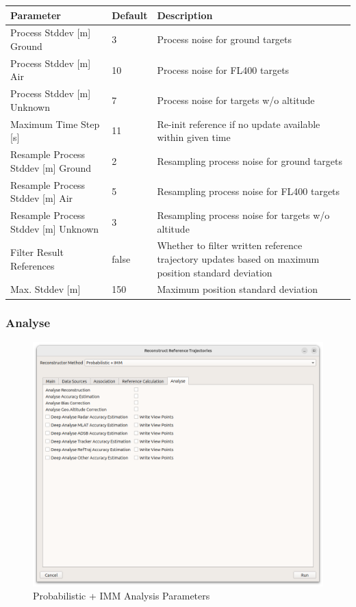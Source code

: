 \begin{table}[H]
  \center
  \begin{tabularx}{\textwidth}{ | l | l | X |}
    \hline
    \textbf{Parameter} & \textbf{Default} &  \textbf{Description} \\ \hline
    Process Stddev [m] Ground & 3 & Process noise for ground targets \\ \hline
    Process Stddev [m] Air & 10 & Process noise for FL400 targets \\ \hline
    Process Stddev [m] Unknown & 7 & Process noise for targets w/o altitude \\ \hline
    Maximum Time Step [s] & 11 & Re-init reference if no update available within given time \\ \hline
    Resample Process Stddev [m] Ground & 2 & Resampling process noise for ground targets \\ \hline
    Resample Process Stddev [m] Air & 5 & Resampling process noise for FL400 targets \\ \hline
    Resample Process Stddev [m] Unknown & 3 & Resampling process noise for targets w/o altitude \\ \hline    
    Filter Result References& false & Whether to filter written reference trajectory updates based on maximum position standard deviation \\ \hline
    Max. Stddev [m] & 150 & Maximum position standard deviation \\ \hline
  \end{tabularx}
\end{table}

\subsubsection{Analyse}

\begin{figure}[H]
    \center
      \includegraphics[width=16cm]{figures/dialog_probimm_analyse.png}
    \caption{Probabilistic + IMM Analysis Parameters}
\end{figure}


